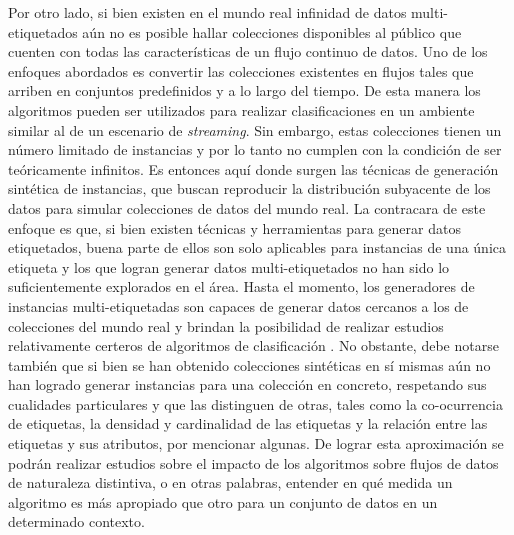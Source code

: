 Por otro lado, si bien existen en el mundo real infinidad de datos
multi-etiquetados aún no es posible hallar colecciones disponibles al público
que cuenten con todas las características de un flujo continuo de datos. Uno de
los enfoques abordados es convertir las colecciones existentes en flujos tales
que arriben en conjuntos predefinidos y a lo largo del tiempo. De esta manera
los algoritmos pueden ser utilizados para realizar clasificaciones en un
ambiente similar al de un escenario de \textit{streaming}. Sin embargo, estas
colecciones tienen un número limitado de instancias y por lo tanto no cumplen
con la condición de ser teóricamente infinitos. Es entonces aquí donde surgen
las técnicas de generación sintética de instancias, que buscan reproducir la
distribución subyacente de los datos para simular colecciones de datos del mundo
real. La contracara de este enfoque es que, si bien existen técnicas y
herramientas para generar datos etiquetados, buena parte de ellos son solo
aplicables para instancias de una única etiqueta y los que logran generar datos
multi-etiquetados no han sido lo suficientemente explorados en el área. Hasta el
momento, los generadores de instancias multi-etiquetadas son capaces de generar
datos cercanos a los de colecciones del mundo real \cite{read_generating_2009} y
brindan la posibilidad de realizar estudios relativamente certeros de algoritmos
de clasificación \cite{read_scalable_2012}. No obstante, debe notarse también
que si bien se han obtenido colecciones sintéticas en sí mismas aún no han
logrado generar instancias para una colección en concreto, respetando sus
cualidades particulares y que las distinguen de otras, tales como la
co-ocurrencia de etiquetas, la densidad y cardinalidad de las etiquetas y la
relación entre las etiquetas y sus atributos, por mencionar algunas. De lograr
esta aproximación se podrán realizar estudios sobre el impacto de los algoritmos
sobre flujos de datos de naturaleza distintiva, o en otras palabras, entender en
qué medida un algoritmo es más apropiado que otro para un conjunto de datos en
un determinado contexto. 

